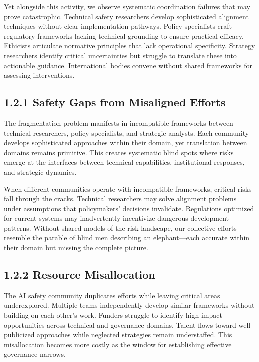 \documentclass[
  11pt,
  letterpaper,
]{book}
\begin{document}
Yet alongside this activity, we observe systematic coordination failures
that may prove catastrophic. Technical safety researchers develop
sophisticated alignment techniques without clear implementation
pathways. Policy specialists craft regulatory frameworks lacking
technical grounding to ensure practical efficacy. Ethicists articulate
normative principles that lack operational specificity. Strategy
researchers identify critical uncertainties but struggle to translate
these into actionable guidance. International bodies convene without
shared frameworks for assessing interventions.

\subsection*{1.2.1 Safety Gaps from Misaligned
Efforts}\label{sec-safety-gaps}

The fragmentation problem manifests in incompatible frameworks between
technical researchers, policy specialists, and strategic analysts. Each
community develops sophisticated approaches within their domain, yet
translation between domains remains primitive. This creates systematic
blind spots where risks emerge at the interfaces between technical
capabilities, institutional responses, and strategic dynamics.

When different communities operate with incompatible frameworks,
critical risks fall through the cracks. Technical researchers may solve
alignment problems under assumptions that policymakers' decisions
invalidate. Regulations optimized for current systems may inadvertently
incentivize dangerous development patterns. Without shared models of the
risk landscape, our collective efforts resemble the parable of blind men
describing an elephant---each accurate within their domain but missing
the complete picture.

\subsection*{1.2.2 Resource
Misallocation}\label{sec-resource-misallocation}

The AI safety community duplicates efforts while leaving critical areas
underexplored. Multiple teams independently develop similar frameworks
without building on each other's work. Funders struggle to identify
high-impact opportunities across technical and governance domains.
Talent flows toward well-publicized approaches while neglected
strategies remain understaffed. This misallocation becomes more costly
as the window for establishing effective governance narrows.
\end{document}
